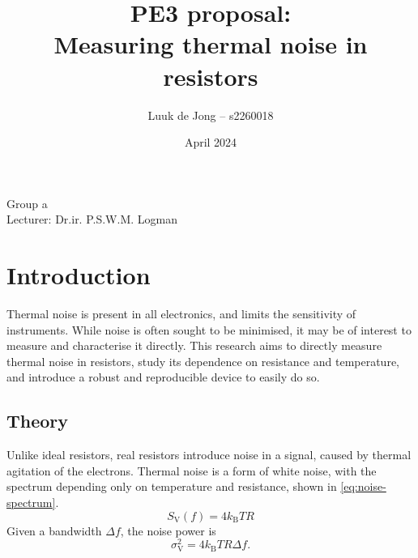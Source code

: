 \documentclass{article}
\title{PE3 proposal:\\ Measuring thermal noise in resistors}
\author{Luuk de Jong -- s2260018}
\date{April 2024}
\begin{document}
\maketitle
\begin{center}
  Group a \\
  Lecturer: Dr.ir. P.S.W.M. Logman 
\end{center}
\section{Introduction}
Thermal noise is present in all electronics, and limits the sensitivity of instruments.
While noise is often sought to be minimised, it may be of interest to measure and characterise it directly.
This research aims to directly measure thermal noise in resistors, study its dependence on resistance and temperature, and introduce a robust and reproducible device to easily do so.
\subsection{Theory}
Unlike ideal resistors, real resistors introduce noise in a signal, caused by thermal agitation of the electrons\cite{nyquist_thermal_1928}.
Thermal noise is a form of white noise, with the spectrum depending only on temperature and resistance\cite{wagenaar_physics_2023}, shown in \autoref{eq:noise-spectrum}.
\begin{equation}
  \label{eq:noise-spectrum}
  S_{\mathrm{V}}(f) = 4k_{\mathrm{B}}TR
\end{equation}
Given a bandwidth $\Delta f$, the noise power is
\begin{equation}
  \label{eq:noise-power}
  \sigma_{\mathrm{V}}^2 = 4k_{\mathrm{B}}TR\Delta f.
\end{equation}
\end{document}

